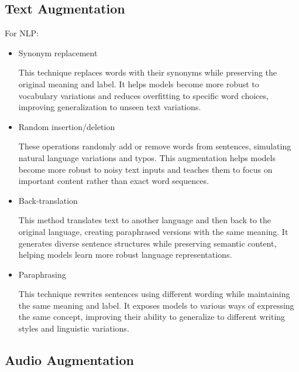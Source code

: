 \subsection{Text Augmentation}

For NLP:
\begin{itemize}
    \item Synonym replacement
    
    This technique replaces words with their synonyms while preserving the original meaning and label. It helps models become more robust to vocabulary variations and reduces overfitting to specific word choices, improving generalization to unseen text variations.
    
    \item Random insertion/deletion
    
    These operations randomly add or remove words from sentences, simulating natural language variations and typos. This augmentation helps models become more robust to noisy text inputs and teaches them to focus on important content rather than exact word sequences.
    
    \item Back-translation
    
    This method translates text to another language and then back to the original language, creating paraphrased versions with the same meaning. It generates diverse sentence structures while preserving semantic content, helping models learn more robust language representations.
    
    \item Paraphrasing
    
    This technique rewrites sentences using different wording while maintaining the same meaning and label. It exposes models to various ways of expressing the same concept, improving their ability to generalize to different writing styles and linguistic variations.
\end{itemize}

\subsection{Audio Augmentation}

